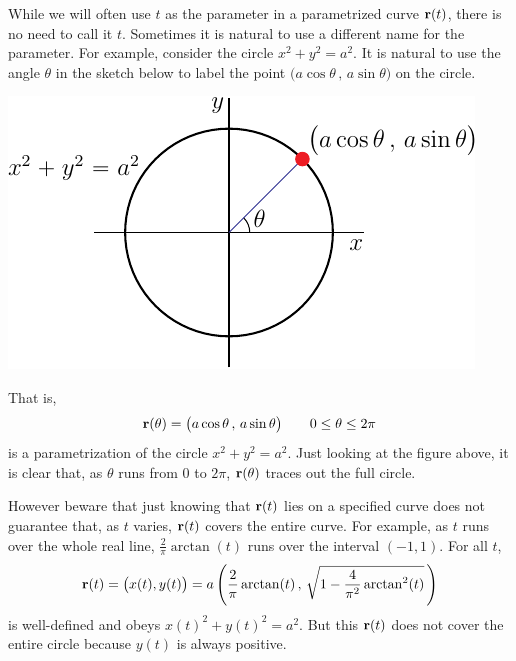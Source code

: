 \begin{eg}[Parametrization of  $x^2+y^2=a^2$]\label{eg:paramCircle}
While we will often use $t$ as the parameter in a parametrized curve $\mathbf{r}(t)$,
there is no need to call it $t$. Sometimes it is natural to use a different 
name for the parameter. For example, consider the circle $x^2+y^2=a^2$.
It is natural to use the angle $\theta$ in the sketch below to label
the point $\big(a\cos\theta\,,\,a\sin\theta\big)$ on the circle. 
\begin{efig}
\begin{center}
     \includegraphics{parCircle.pdf}
\end{center}
\end{efig}
That is,
\begin{equation*}
\mathbf{r}(\theta) = \big(a\cos\theta\,,\,a\sin\theta\big)\qquad
0\le \theta\le 2\pi
\end{equation*}
is a parametrization of the circle $x^2+y^2=a^2$. Just looking at the figure above, it is clear that, as $\theta$ runs from $0$ to $2\pi$, $\mathbf{r}(\theta)$
traces out the full circle. 

However beware that just knowing that 
$\mathbf{r}(t)$ lies on a specified curve does not guarantee that, as $t$ varies,
$\mathbf{r}(t)$ covers the entire curve. For example, as $t$ runs over the whole
real line, $\frac{2}{\pi}\arctan(t)$ runs over the interval $(-1,1)$.
For all $t$,
\begin{equation*}
\mathbf{r}(t) = \big(x(t),y(t)\big) 
       = a\left(\frac{2}{\pi}\arctan(t)\,,\,
                \sqrt{1-\frac{4}{\pi^2}\arctan^2(t)}\,\right)
\end{equation*}
is well-defined and obeys $x(t)^2+y(t)^2=a^2$. But this $\mathbf{r}(t)$ does not
cover the entire circle because $y(t)$ is always positive.

\end{eg}

